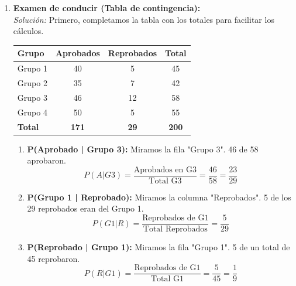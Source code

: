 \documentclass[12pt, letterpaper]{article}
\begin{document}
\begin{enumerate}
	\item \textbf{Examen de conducir (Tabla de contingencia):} \\
	      \textit{Solución:} Primero, completamos la tabla con los totales para facilitar los cálculos.
	      \begin{center}
		      \begin{tabular}{|l|c|c|c|}
			      \hline
			      \textbf{Grupo} & \textbf{Aprobados} & \textbf{Reprobados} & \textbf{Total} \\
			      \hline
			      Grupo 1        & 40                 & 5                   & 45             \\
			      Grupo 2        & 35                 & 7                   & 42             \\
			      Grupo 3        & 46                 & 12                  & 58             \\
			      Grupo 4        & 50                 & 5                   & 55             \\
			      \hline
			      \textbf{Total} & \textbf{171}       & \textbf{29}         & \textbf{200}   \\
			      \hline
		      \end{tabular}
	      \end{center}
	      \begin{enumerate}
		      \item \textbf{P(Aprobado | Grupo 3):} Miramos la fila "Grupo 3". 46 de 58 aprobaron.
		            \[ P(A|G3) = \frac{\text{Aprobados en G3}}{\text{Total G3}} = \frac{46}{58} = \frac{23}{29} \]
		      \item \textbf{P(Grupo 1 | Reprobado):} Miramos la columna "Reprobados". 5 de los 29 reprobados eran del Grupo 1.
		            \[ P(G1|R) = \frac{\text{Reprobados de G1}}{\text{Total Reprobados}} = \frac{5}{29} \]
		      \item \textbf{P(Reprobado | Grupo 1):} Miramos la fila "Grupo 1". 5 de un total de 45 reprobaron.
		            \[ P(R|G1) = \frac{\text{Reprobados de G1}}{\text{Total G1}} = \frac{5}{45} = \frac{1}{9} \]
	      \end{enumerate}
\end{enumerate}
\newpage

\end{document}
